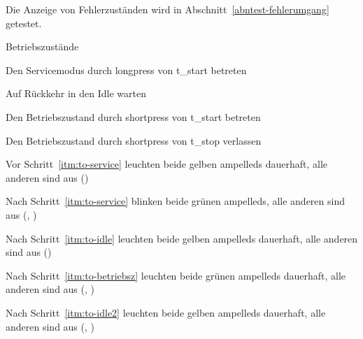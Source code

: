 \label{abntest-zustandsanzeigen}
\begin{anmerkungen}
    \item Die Anzeige von Fehlerzuständen wird in Abschnitt~\ref{abntest-fehlerumgang} getestet.
\end{anmerkungen}

\begin{ablauf}{Betriebszustände}
    \item \label{itm:to-service} Den Servicemodus durch \gls{longpress} von \gls{t_start} betreten
    \item \label{itm:to-idle} Auf Rückkehr in den Idle warten
    \item \label{itm:to-betriebsz} Den Betriebszustand durch \gls{shortpress} von \gls{t_start} betreten
    \item \label{itm:to-idle2} Den Betriebszustand durch \gls{shortpress} von \gls{t_stop} verlassen
\end{ablauf}
\begin{erwartung}
    \item Vor Schritt~\ref{itm:to-service} leuchten
    beide gelben \glspl{ampelled} dauerhaft, alle anderen sind aus ()
    \item Nach Schritt~\ref{itm:to-service} blinken
    beide grünen \glspl{ampelled}, alle anderen sind aus (, )
    \item Nach Schritt~\ref{itm:to-idle} leuchten
    beide gelben \glspl{ampelled} dauerhaft, alle anderen sind aus ()
    \item Nach Schritt~\ref{itm:to-betriebsz} leuchten
    beide grünen \glspl{ampelled} dauerhaft, alle anderen sind aus (, )
    \item Nach Schritt~\ref{itm:to-idle2} leuchten
    beide gelben \glspl{ampelled} dauerhaft, alle anderen sind aus (, )
\end{erwartung}

